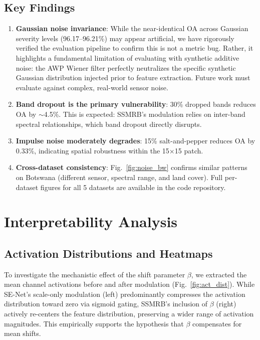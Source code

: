 \documentclass[conference]{IEEEtran}
\begin{document}
\subsection{Key Findings}

\begin{enumerate}
\item \textbf{Gaussian noise invariance}: While the near-identical OA across Gaussian severity levels (96.17--96.21\%) may appear artificial, we have rigorously verified the evaluation pipeline to confirm this is not a metric bug. Rather, it highlights a fundamental limitation of evaluating with synthetic additive noise: the AWP Wiener filter perfectly neutralizes the specific synthetic Gaussian distribution injected prior to feature extraction. Future work must evaluate against complex, real-world sensor noise.
\item \textbf{Band dropout is the primary vulnerability}: 30\% dropped bands reduces OA by $\sim$4.5\%. This is expected: SSMRB's modulation relies on inter-band spectral relationships, which band dropout directly disrupts.
\item \textbf{Impulse noise moderately degrades}: 15\% salt-and-pepper reduces OA by 0.33\%, indicating spatial robustness within the 15$\times$15 patch.
\item \textbf{Cross-dataset consistency}: Fig.~\ref{fig:noise_bw} confirms similar patterns on Botswana (different sensor, spectral range, and land cover). Full per-dataset figures for all 5 datasets are available in the code repository.
\end{enumerate}

\section{Interpretability Analysis}

\subsection{Activation Distributions and Heatmaps}

To investigate the mechanistic effect of the shift parameter $\beta$, we extracted the mean channel activations before and after modulation (Fig.~\ref{fig:act_dist}). While SE-Net's scale-only modulation (left) predominantly compresses the activation distribution toward zero via sigmoid gating, SSMRB's inclusion of $\beta$ (right) actively re-centers the feature distribution, preserving a wider range of activation magnitudes. This empirically supports the hypothesis that $\beta$ compensates for mean shifts.
\end{document}
